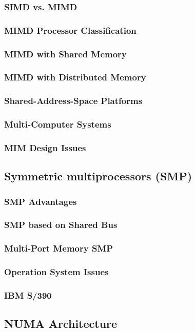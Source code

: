\documentclass[titlepage, a4paper]{article}
\begin{document}
\subsubsection{SIMD vs. MIMD}
\subsubsection{MIMD Processor Classification}
\subsubsection{MIMD with Shared Memory}
\subsubsection{MIMD with Distributed Memory}
\subsubsection{Shared-Address-Space Platforms}
\subsubsection{Multi-Computer Systems}
\subsubsection{MIM Design Issues}
\subsection{Symmetric multiprocessors (SMP)}
\subsubsection{SMP Advantages}
\subsubsection{SMP based on Shared Bus}
\subsubsection{Multi-Port Memory SMP}
\subsubsection{Operation System Issues}
\subsubsection{IBM S/390}
\subsection{NUMA Architecture}
\end{document}
